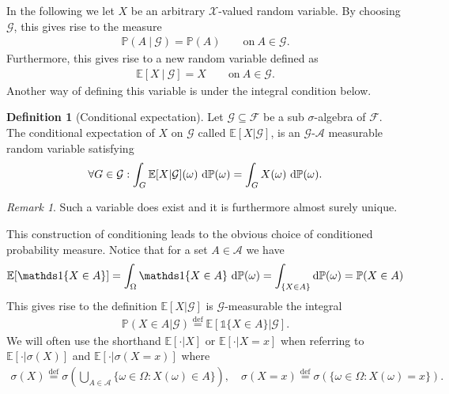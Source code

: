 \documentclass[12pt,letter,twoside]{article}
\theoremstyle{plain}
\theoremstyle{definition}
\newtheorem{definition}[theorem]{Definition}
\theoremstyle{remark}
\newtheorem*{remark}{Remark}
\begin{document}
In the following we let $X$ be an arbitrary $\mathcal X$-valued random variable. By choosing $\mathcal G$, this gives rise to the measure
\begin{align}
    \mathbb P(A\ \vert\ \mathcal G)=\mathbb P(A)\qquad \text{on}\ A\in\mathcal G.
\end{align}
Furthermore, this gives rise to a new random variable defined as
\begin{align}
    \mathbb E[X\ \vert\ \mathcal G]=X\qquad \text{on}\ A\in\mathcal G.
\end{align}
Another way of defining this variable is under the integral condition below.
\begin{definition}[Conditional expectation]
Let $\mathcal G\subseteq \mathcal F$ be a sub $\sigma$-algebra of $\mathcal F$. The conditional expectation of $X$ on $\mathcal G$ called $\mathbb E[X\vert \mathcal G]$, is an $\mathcal G$-$\mathcal A$ measurable random variable satisfying
\begin{align}
    \forall G\in \mathcal G : \int_G \mathbb E[X\vert\mathcal G](\omega)\ \text d\mathbb P(\omega)=\int_G X(\omega)\ \text d\mathbb P(\omega).
\end{align}
\end{definition}
\begin{remark}
Such a variable does exist and it is furthermore almost surely unique. \autocite[][p. 340]{hansen2021}
\end{remark}
This construction of conditioning leads to the obvious choice of conditioned probability measure. Notice that for a set $A\in\mathcal A$ we have
\begin{align}
\mathbb E[\mathds 1\{X\in A\}]=\int_\Omega \mathds 1\{X\in A\}\ \text d\mathbb P(\omega)=\int_{\{X\in A\}}\text d\mathbb P(\omega)=\mathbb P(X\in A)
\end{align}
This gives rise to the definition $\mathbb E[X\vert \mathcal G]$ is $\mathcal G$-measurable the integral
\begin{align}
\mathbb P(X\in A\vert \mathcal G)\stackrel{\text{def}}{=}\mathbb E[\mathds 1\{X\in A\}\vert \mathcal G].
\end{align}
We will often use the shorthand $\mathbb E[\cdot \vert X]$ or $\mathbb E[\cdot\vert X=x]$ when referring to $\mathbb E[\cdot \vert \sigma(X)]$ and $\mathbb E[\cdot \vert \sigma(X=x)]$ where
\begin{align}
    \sigma(X)\stackrel{\text{def}}{=}\sigma\left(\bigcup_{A\in\mathcal A}\{\omega \in \Omega : X(\omega)\in A\}\right),\quad \sigma(X=x)\stackrel{\text{def}}{=}\sigma\left(\{\omega \in \Omega : X(\omega)=x\}\right).
\end{align}
\end{document}
